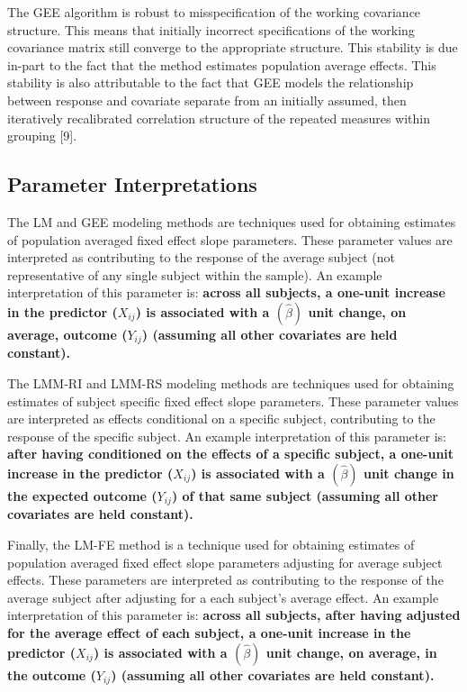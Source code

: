 \documentclass[12pt,]{article}
\begin{document}
The GEE algorithm is robust to misspecification of the working
covariance structure. This means that initially incorrect specifications
of the working covariance matrix still converge to the appropriate
structure. This stability is due in-part to the fact that the method
estimates population average effects. This stability is also
attributable to the fact that GEE models the relationship between
response and covariate separate from an initially assumed, then
iteratively recalibrated correlation structure of the repeated measures
within grouping {[}9{]}.

\hypertarget{parameter-interpretations}{%
\subsection{Parameter Interpretations}\label{parameter-interpretations}}

The LM and GEE modeling methods are techniques used for obtaining
estimates of population averaged fixed effect slope parameters. These
parameter values are interpreted as contributing to the response of the
average subject (not representative of any single subject within the
sample). An example interpretation of this parameter is: \textbf{across
all subjects, a one-unit increase in the predictor (\(X_{ij}\)) is
associated with a \((\hat{\beta})\) unit change, on average, outcome
(\(Y_{ij}\)) (assuming all other covariates are held constant).}

\vspace{10pt}

The LMM-RI and LMM-RS modeling methods are techniques used for obtaining
estimates of subject specific fixed effect slope parameters. These
parameter values are interpreted as effects conditional on a specific
subject, contributing to the response of the specific subject. An
example interpretation of this parameter is: \textbf{after having
conditioned on the effects of a specific subject, a one-unit increase in
the predictor (\(X_{ij}\)) is associated with a \((\hat{\beta})\) unit
change in the expected outcome (\(Y_{ij}\)) of that same subject
(assuming all other covariates are held constant).}

\vspace{10pt}

Finally, the LM-FE method is a technique used for obtaining estimates of
population averaged fixed effect slope parameters adjusting for average
subject effects. These parameters are interpreted as contributing to the
response of the average subject after adjusting for a each subject's
average effect. An example interpretation of this parameter is:
\textbf{across all subjects, after having adjusted for the average
effect of each subject, a one-unit increase in the predictor
(\(X_{ij}\)) is associated with a \((\hat{\beta})\) unit change, on
average, in the outcome (\(Y_{ij}\)) (assuming all other covariates are
held constant).}
\end{document}
